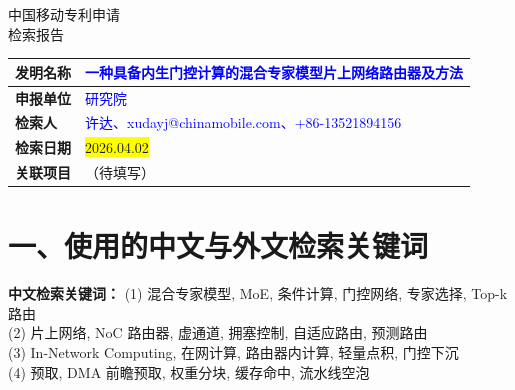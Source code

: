 \documentclass[12pt,a4paper]{article}
\begin{document}
\noindent

\vspace{1em}

\begin{center}
    {\Huge\heiti 中国移动专利申请} \\[0.5em]
    {\Huge\heiti 检索报告} \\[1em]
\end{center}

\begin{table}[h]
    \centering
    \renewcommand{\arraystretch}{2}
    \begin{tabular}{|p{3cm}|p{12cm}|}
        \hline
        \textbf{发明名称} & \textcolor{blue}{一种具备内生门控计算的混合专家模型片上网络路由器及方法} \\
        \hline
        \textbf{申报单位} & \textcolor{blue}{研究院} \\
        \hline
        \textbf{检索人} & \textcolor{blue}{许达、xudayj@chinamobile.com、+86-13521894156} \\
        \hline
        \textbf{检索日期} & \colorbox{yellow}{2026.04.02} \\
        \hline
        \textbf{关联项目} & （待填写） \\
        \hline
    \end{tabular}
\end{table}

\vspace{0.5em}

\noindent{}

\vspace{1em}


\section*{一、使用的中文与外文检索关键词}

\textbf{中文检索关键词：}
(1) 混合专家模型, MoE, 条件计算, 门控网络, 专家选择, Top-k 路由 \\
(2) 片上网络, NoC 路由器, 虚通道, 拥塞控制, 自适应路由, 预测路由 \\
(3) In-Network Computing, 在网计算, 路由器内计算, 轻量点积, 门控下沉 \\
(4) 预取, DMA 前瞻预取, 权重分块, 缓存命中, 流水线空泡
\end{document}

